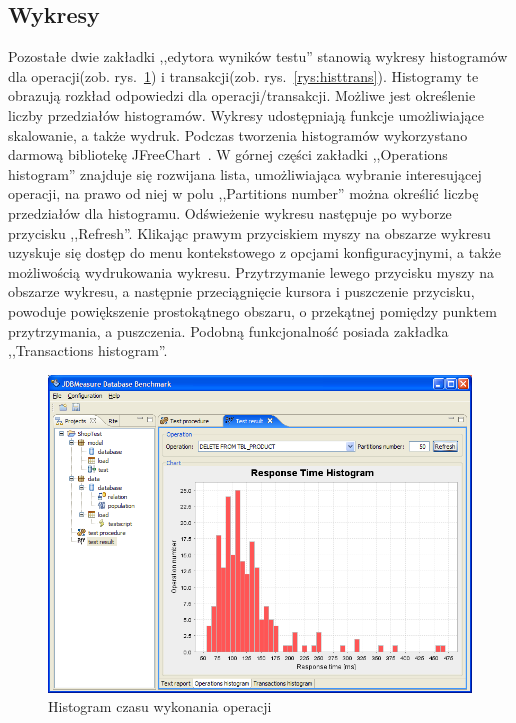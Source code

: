 \subsection{Wykresy}
Pozostałe dwie zakładki ,,edytora wyników testu'' stanowią wykresy histogramów
dla operacji(zob. rys.~\ref{rys:histoper}) i transakcji(zob. rys.~\ref{rys:histtrans}).
Histogramy te obrazują rozkład odpowiedzi dla operacji/transakcji. Możliwe jest określenie
liczby przedziałów histogramów. Wykresy udostępniają funkcje umożliwiające skalowanie,
a także wydruk. Podczas tworzenia histogramów wykorzystano darmową bibliotekę JFreeChart~\cite{JFreeChart1}.
W górnej części zakładki ,,Operations histogram'' znajduje się rozwijana lista, umożliwiająca wybranie interesującej operacji,
na prawo od niej w polu ,,Partitions number'' można określić liczbę przedziałów dla histogramu. Odświeżenie wykresu 
następuje po wyborze przycisku ,,Refresh''. Klikając prawym przyciskiem myszy na obszarze wykresu uzyskuje się dostęp
do menu kontekstowego z opcjami konfiguracyjnymi, a także możliwością wydrukowania wykresu. Przytrzymanie lewego przycisku myszy 
na obszarze wykresu, a następnie przeciągnięcie kursora i puszczenie przycisku, powoduje powiększenie prostokątnego obszaru,
o przekątnej pomiędzy punktem przytrzymania, a puszczenia. Podobną funkcjonalność posiada zakładka ,,Transactions histogram''. 

\begin{figure}[!h]
\begin{center}
\includegraphics[width=0.9\linewidth]{figures/gui/31.png}
\end{center}
\caption{Histogram czasu wykonania operacji}\label{rys:histoper}
\end{figure}

